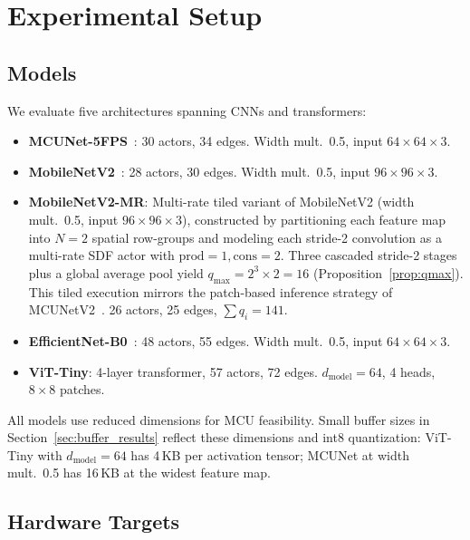 \documentclass[journal]{IEEEtran}
\begin{document}
\section{Experimental Setup}

\subsection{Models}

We evaluate five architectures spanning CNNs and transformers:
\begin{itemize}[nosep]
\item \textbf{MCUNet-5FPS}~\cite{lin2020mcunet}: 30 actors, 34 edges. Width mult.\ 0.5, input $64{\times}64{\times}3$.
\item \textbf{MobileNetV2}~\cite{sandler2018mobilenetv2}: 28 actors, 30 edges. Width mult.\ 0.5, input $96{\times}96{\times}3$.
\item \textbf{MobileNetV2-MR}: Multi-rate tiled variant of MobileNetV2 (width mult.\ 0.5, input $96{\times}96{\times}3$), constructed by partitioning each feature map into $N{=}2$ spatial row-groups and modeling each stride-2 convolution as a multi-rate SDF actor with $\mathrm{prod}{=}1, \mathrm{cons}{=}2$. Three cascaded stride-2 stages plus a global average pool yield $q_{\max} = 2^3 \times 2 = 16$ (Proposition~\ref{prop:qmax}). This tiled execution mirrors the patch-based inference strategy of MCUNetV2~\cite{lin2021mcunetv2}. 26 actors, 25 edges, $\sum q_i{=}141$.
\item \textbf{EfficientNet-B0}~\cite{tan2019efficientnet}: 48 actors, 55 edges. Width mult.\ 0.5, input $64{\times}64{\times}3$.
\item \textbf{ViT-Tiny}: 4-layer transformer, 57 actors, 72 edges. $d_{\mathrm{model}}{=}64$, 4 heads, $8{\times}8$ patches.
\end{itemize}

All models use reduced dimensions for MCU feasibility.
Small buffer sizes in Section~\ref{sec:buffer_results} reflect these dimensions and int8 quantization: ViT-Tiny with $d_{\mathrm{model}} = 64$ has 4\,KB per activation tensor; MCUNet at width mult.\ 0.5 has 16\,KB at the widest feature map.

\subsection{Hardware Targets}
\label{sec:hardware}
\end{document}
